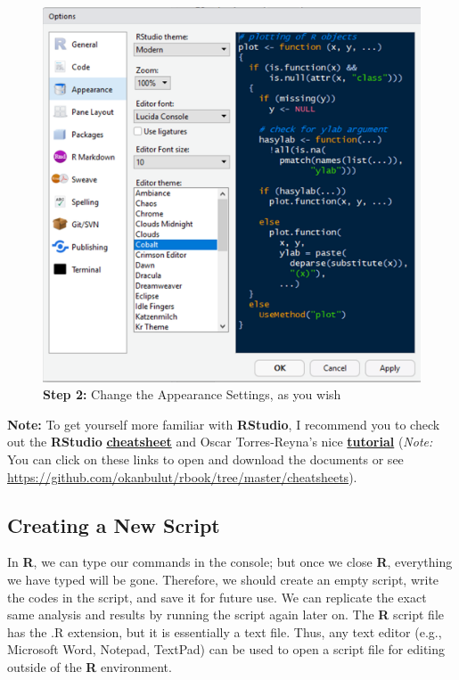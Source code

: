 \documentclass[]{book}
\begin{document}
\begin{figure}
\centering
\includegraphics{figure/img4.png}
\caption{\textbf{Step 2:} Change the Appearance Settings, as you wish}
\end{figure}

\textbf{Note:} To get yourself more familiar with \textbf{RStudio}, I recommend you to check out the \textbf{RStudio} \href{https://github.com/okanbulut/rbook/blob/master/cheatsheets/rstudio-ide.pdf}{\textbf{cheatsheet}} and Oscar Torres-Reyna's nice \href{https://github.com/okanbulut/rbook/blob/master/cheatsheets/rstudio_tutorial.pdf}{\textbf{tutorial}} (\emph{Note:} You can click on these links to open and download the documents or see \url{https://github.com/okanbulut/rbook/tree/master/cheatsheets}).

\hypertarget{creating-a-new-script}{%
\subsection{Creating a New Script}\label{creating-a-new-script}}

In \textbf{R}, we can type our commands in the console; but once we close \textbf{R}, everything we have typed will be gone. Therefore, we should create an empty script, write the codes in the script, and save it for future use. We can replicate the exact same analysis and results by running the script again later on. The \textbf{R} script file has the .R extension, but it is essentially a text file. Thus, any text editor (e.g., Microsoft Word, Notepad, TextPad) can be used to open a script file for editing outside of the \textbf{R} environment.
\end{document}
